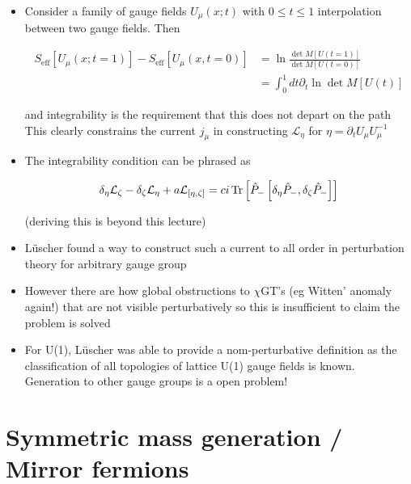 \begin{itemize}
  \item Consider a family of gauge fields \(U_{\mu}(x ; t)\) with \( 0 \leq t \leq 1\) interpolation between two gauge fields. Then

\begin{equation}
\begin{aligned}
S_{\text{eff}}\left[U_{\mu}(x ; t=1)\right]-S_{\text{eff}}\left[U_{\mu}(x, t=0)\right]&=\ln \frac{\operatorname{det} M[U(t=1)]}{\operatorname{det} M[U(t=0)]} \\
&=\int_{0}^{1} d t \partial_{t} \ln \operatorname{det} M[U(t)]
\end{aligned}
\end{equation}

and integrability is the requirement that this does not depart on the path This clearly constrains the current $j_\mu$ in constructing \(\mathcal{L}_{\eta}\) for \(\eta=\partial_{t} U_{\mu} U_{\mu}^{-1}\)

  \item The integrability condition can be phrased as

\begin{equation}
\delta_{\eta} {\cal L}_{\zeta}-\delta_{\zeta} {\cal L}_{\eta}+a {\cal L}_{[\eta, \zeta]}=ci \operatorname{Tr}\left[\hat{P}_{-}\left[\delta_{\eta} \hat{P}_{-}, \delta_{\zeta} \hat{P}_{-}\right]\right]
\end{equation}

(deriving this is beyond this lecture)

  \item L\"uscher found a way to construct such a current to all order in perturbation theory for arbitrary gauge group
  \item However there are how global obstructions to $\chi$GT's (eg Witten' anomaly again!) that are not visible perturbatively so this is insufficient to claim the problem is solved
  \item For U(1), L\"uscher was able to provide a nom-perturbative definition as the classification of all topologies of lattice U(1) gauge fields is known. Generation to other gauge groups is a open problem!
\end{itemize}

  
\section{Symmetric mass generation / Mirror fermions}

